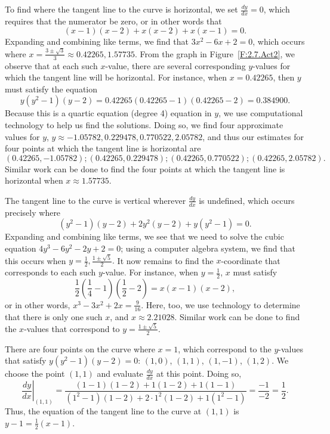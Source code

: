 \begin{activitySolution}
\ba
	\item To find where the tangent line to the curve is horizontal, we set $\frac{dy}{dx} = 0$, which requires that the numerator be zero, or in other words that
	$$(x-1)(x-2) + x(x-2) + x(x-1) = 0.$$
	Expanding and combining like terms, we find that $3x^2 - 6x + 2 = 0$, which occurs where $x = \frac{3\pm\sqrt{3}}{3} \approx 0.42265, 1.57735$. From the graph in Figure~\ref{F:2.7.Act2}, we observe that at each such $x$-value, there are several corresponding $y$-values for which the tangent line will be horizontal.  For instance, when $x = 0.42265$, then $y$ must satisfy the equation
	$$y(y^2-1)(y-2) = 0.42265(0.42265-1)(0.42265-2) = 0.384900.$$
	Because this is a quartic equation (degree 4) equation in $y$, we use computational technology to help us find the solutions.  Doing so, we find four approximate values for $y$, $y \approx -1.05782, 0.229478, 0.770522, 2.05782$, and thus our estimates for four points at which the tangent line is horizontal are
	$$(0.42265, -1.05782); (0.42265, 0.229478);  (0.42265, 0.770522); (0.42265, 2.05782).$$
	Similar work can be done to find the four points at which the tangent line is horizontal when $x \approx 1.57735$.
	\item The tangent line to the curve is vertical wherever $\frac{dy}{dx}$ is undefined, which occurs precisely where 
	$$(y^2-1)(y-2) + 2y^2(y-2) + y(y^2-1) = 0.$$
	Expanding and combining like terms, we see that we need to solve the cubic equation $4y^3 - 6y^2 - 2y + 2 = 0$; using a computer algebra system, we find that this occurs when $y = \frac{1}{2}, \frac{1 \pm \sqrt{5}}{2}.$  It now remains to find the $x$-coordinate that corresponds to each such $y$-value.  For instance, when $y = \frac{1}{2}$, $x$ must satisfy
	$$\frac{1}{2}(\frac{1}{4}-1)(\frac{1}{2}-2) = x(x-1)(x-2),$$
	or in other words, $x^3 - 3x^2 + 2x = \frac{9}{16}.$  Here, too, we use technology to determine that there is only one such $x$, and $x \approx 2.21028$.  Similar work can be done to find the $x$-values that correspond to $y = \frac{1 \pm \sqrt{5}}{2}$.
	\item There are four points on the curve where $x = 1$, which correspond to the $y$-values that satisfy $y(y^2-1)(y-2) = 0$: $(1,0)$, $(1,1)$, $(1,-1)$, $(1,2)$.  We choose the point $(1,1)$ and evaluate $\frac{dy}{dx}$ at this point.  Doing so,
	  $$\left.\frac{dy}{dx} \right|_{(1,1)} = \frac{(1-1)(1-2) + 1(1-2) + 1(1-1)}{(1^2-1)(1-2) + 2\cdot 1^2(1-2) + 1(1^2-1)} = \frac{-1}{-2} = \frac{1}{2}.$$
Thus, the equation of the tangent line to the curve at $(1,1)$ is $y - 1 = \frac{1}{2}(x-1)$.
\ea
\end{activitySolution}
\aftera